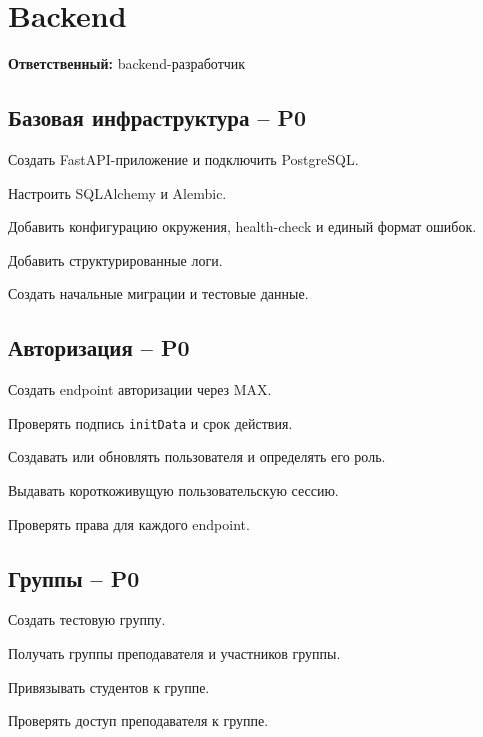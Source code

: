 \documentclass[11pt,a4paper]{article}
\newcommand{\PZero}{\textcolor{PZero}{\textbf{P0}}}
\newcommand{\owner}[1]{\textcolor{Muted}{\textbf{Ответственный:} #1}}
\newcommand{\code}[1]{\texttt{#1}}
\begin{document}
\section{Backend}
\owner{backend-разработчик}

\subsection{Базовая инфраструктура -- \PZero}
\begin{tasklist}
  \item Создать FastAPI-приложение и подключить PostgreSQL.
  \item Настроить SQLAlchemy и Alembic.
  \item Добавить конфигурацию окружения, health-check и единый формат ошибок.
  \item Добавить структурированные логи.
  \item Создать начальные миграции и тестовые данные.
\end{tasklist}

\subsection{Авторизация -- \PZero}
\begin{tasklist}
  \item Создать endpoint авторизации через MAX.
  \item Проверять подпись \code{initData} и срок действия.
  \item Создавать или обновлять пользователя и определять его роль.
  \item Выдавать короткоживущую пользовательскую сессию.
  \item Проверять права для каждого endpoint.
\end{tasklist}

\subsection{Группы -- \PZero}
\begin{tasklist}
  \item Создать тестовую группу.
  \item Получать группы преподавателя и участников группы.
  \item Привязывать студентов к группе.
  \item Проверять доступ преподавателя к группе.
\end{tasklist}
\end{document}
